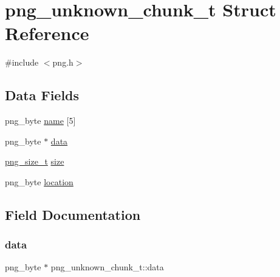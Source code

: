\hypertarget{structpng__unknown__chunk__t}{}\section{png\+\_\+unknown\+\_\+chunk\+\_\+t Struct Reference}
\label{structpng__unknown__chunk__t}


{\ttfamily \#include $<$png.\+h$>$}

\subsection*{Data Fields}
\begin{DoxyCompactItemize}
\item 
png\+\_\+byte \hyperlink{structpng__unknown__chunk__t_a8248a7c49234f9dc5fa3fa16a2d3d34c}{name} \mbox{[}5\mbox{]}
\item 
png\+\_\+byte $\ast$ \hyperlink{structpng__unknown__chunk__t_afac46904a501dc44f50a6cf342ad4038}{data}
\item 
\hyperlink{libpng16_2pngconf_8h_a975e35d0a699ea3b08b8feef90fd29eb}{png\+\_\+size\+\_\+t} \hyperlink{structpng__unknown__chunk__t_a0a691245e0c04f01ecf767f215b6a652}{size}
\item 
png\+\_\+byte \hyperlink{structpng__unknown__chunk__t_af56bfc32223b97fbcb6bd29ba7a1cc29}{location}
\end{DoxyCompactItemize}


\subsection{Field Documentation}
\mbox{\label{structpng__unknown__chunk__t_afac46904a501dc44f50a6cf342ad4038}} 
\subsubsection{\texorpdfstring{data}{data}}
{\footnotesize\ttfamily png\+\_\+byte $\ast$ png\+\_\+unknown\+\_\+chunk\+\_\+t\+::data}

\mbox{\label{structpng__unknown__chunk__t_af56bfc32223b97fbcb6bd29ba7a1cc29}} 
